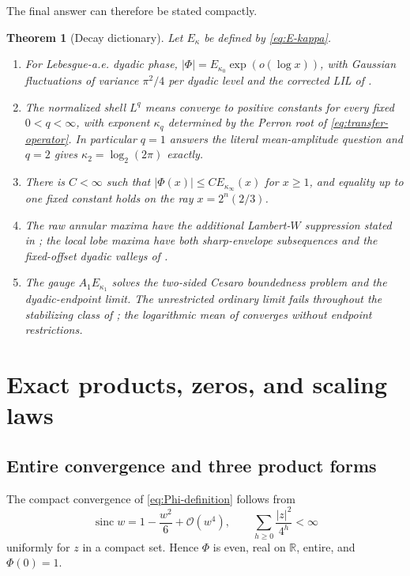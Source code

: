 \documentclass[11pt,oneside]{article}
\newtheorem{theorem}{Theorem}[section]
\theoremstyle{definition}
\theoremstyle{remark}
\newcommand{\R}{\mathbb R}
\newcommand{\sinc}{\operatorname{sinc}}
\newcommand{\Phiup}{\Phi}
\newcommand{\bigO}{\mathcal O}
\newcommand{\abs}[1]{\left|#1\right|}
\begin{document}
The final answer can therefore be stated compactly.

\begin{theorem}[Decay dictionary]
\label{thm:decay-dictionary}
Let $E_\kappa$ be defined by \eqref{eq:E-kappa}.
\begin{enumerate}
\item For Lebesgue-a.e. dyadic phase, $|\Phi|=E_{\kappa_0}\exp(o(\log x))$,
with Gaussian fluctuations of variance $\pi^2/4$ per dyadic level and the corrected LIL of
.
\item The normalized shell $L^q$ means converge to positive constants for every fixed
$0<q<\infty$, with exponent $\kappa_q$ determined by the Perron root of
\eqref{eq:transfer-operator}.  In particular $q=1$ answers the literal mean-amplitude
question and $q=2$ gives $\kappa_2=\log_2(2\pi)$ exactly.
\item There is $C<\infty$ such that $|\Phi(x)|\le C E_{\kappa_\infty}(x)$ for $x\ge1$,
and equality up to one fixed constant holds on the ray $x=2^n(2/3)$.
\item The raw annular maxima have the additional Lambert-$W$ suppression stated in
; the local lobe maxima have both sharp-envelope subsequences and the
fixed-offset dyadic valleys of .
\item The gauge $A_1E_{\kappa_1}$ solves the two-sided Cesaro boundedness problem and the
dyadic-endpoint limit.  The unrestricted ordinary limit fails throughout the stabilizing
class of ; the logarithmic mean of
 converges without endpoint restrictions.
\end{enumerate}
\end{theorem}

\section{Exact products, zeros, and scaling laws}
\label{sec:exact-products}

\subsection{Entire convergence and three product forms}

The compact convergence of \eqref{eq:Phi-definition} follows from
\[
 \sinc w=1-\frac{w^2}{6}+\bigO(w^4),
 \qquad
 \sum_{h\ge0}\frac{\abs z^2}{4^h}<\infty
\]
uniformly for $z$ in a compact set.  Hence $\Phiup$ is even, real on $\R$, entire, and
$\Phiup(0)=1$.
\end{document}
